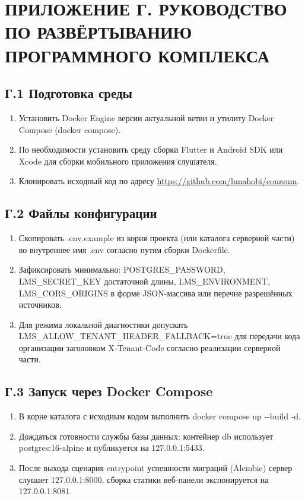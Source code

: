 \chapter{{\fontsize{14pt}{21pt}\selectfont\MakeUppercase{Приложение Г. Руководство по развёртыванию программного комплекса}}}
\label{app:deploy}

\section*{Г.1 Подготовка среды}

\begin{enumerate}
  \item Установить Docker Engine версии актуальной ветви и утилиту Docker Compose (docker compose).
  \item По необходимости установить среду сборки Flutter и Android SDK или Xcode для сборки мобильного приложения слушателя.
  \item Клонировать исходный код по адресу \url{https://github.com/lunahobi/coursum}.
\end{enumerate}

\section*{Г.2 Файлы конфигурации}

\begin{enumerate}
  \item Скопировать .env.example из корня проекта (или каталога серверной части) во внутреннее имя .env согласно путям сборки Dockerfile.
  \item Зафиксировать минимально: POSTGRES\_PASSWORD, LMS\_SECRET\_KEY достаточной длины, LMS\_ENVIRONMENT, LMS\_CORS\_ORIGINS в форме JSON-массива или перечне разрешённых источников.
  \item Для режима локальной диагностики допускать LMS\_ALLOW\_TENANT\_HEADER\_FALLBACK=true для передачи кода организации заголовком X-Tenant-Code согласно реализации серверной части.
\end{enumerate}

\section*{Г.3 Запуск через Docker Compose}

\begin{enumerate}
  \item В корне каталога с исходным кодом выполнить docker compose up {-}{-}build -d.
  \item Дождаться готовности службы базы данных: контейнер db использует postgres:16-alpine и публикуется на 127.0.0.1:5433.
  \item После выхода сценария entrypoint успешности миграций (Alembic) сервер слушает 127.0.0.1:8000, сборка статики веб-панели экспонируется на 127.0.0.1:8081.
\end{enumerate}

